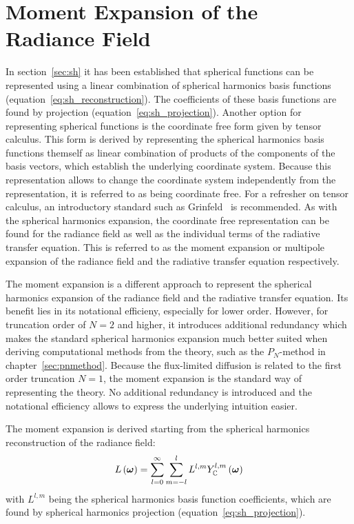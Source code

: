 \section{Moment Expansion of the Radiance Field}
\label{sec:da_moment_expansion_L}

In section~\ref{sec:sh} it has been established that spherical functions can be represented using a linear combination of spherical harmonics basis functions (equation~\ref{eq:sh_reconstruction}). The coefficients of these basis functions are found by projection (equation~\ref{eq:sh_projection}). Another option for representing spherical functions is the coordinate free form given by tensor calculus. This form is derived by representing the spherical harmonics basis functions themself as linear combination of products of the components of the basis vectors, which establish the underlying coordinate system. Because this representation allows to change the coordinate system independently from the representation, it is referred to as being coordinate free. For a refresher on tensor calculus, an introductory standard such as Grinfeld~\cite{Grinfeld13} is recommended. As with the spherical harmonics expansion, the coordinate free representation can be found for the radiance field as well as the individual terms of the radiative transfer equation. This is referred to as the moment expansion or multipole expansion of the radiance field and the radiative transfer equation respectively.

The moment expansion is a different approach to represent the spherical harmonics expansion of the radiance field and the radiative transfer equation. Its benefit lies in its notational efficieny, especially for lower order. However, for truncation order of $N=2$ and higher, it introduces additional redundancy which makes the standard spherical harmonics expansion much better suited when deriving computational methods from the theory, such as the $P_N$-method in chapter~\ref{sec:pnmethod}. Because the flux-limited diffusion is related to the first order truncation $N=1$, the moment expansion is the standard way of representing the theory. No additional redundancy is introduced and the notational efficiency allows to express the underlying intuition easier.

The moment expansion is derived starting from the spherical harmonics reconstruction of the radiance field:
\begin{align}
\label{eq:fld_moment_expansion_sh_expansion}
L\left(\boldsymbol{\mathbf{\omega}}\right) =
\sum_{l=0}^{\infty}\sum_{m=-l}^{l}L^{l,m}Y_{\mathbb{C}}^{l,m}
\left(\boldsymbol{\mathbf{\omega}}\right)
\end{align}
with $L^{l,m}$ being the spherical harmonics basis function coefficients, which are found by spherical harmonics projection (equation~\ref{eq:sh_projection}).


